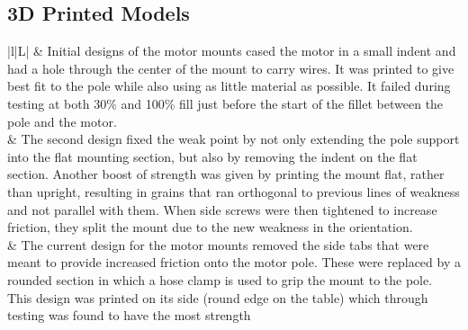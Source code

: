 \newpage

\subsection{3D Printed Models}
\label{sec:print}
\begin{table}[!htbp]
	\centering
	\caption{Modelling iterations for motor mounts}
	\begin{tabulary}{\textwidth}{|l|L|}
		\hline 
		\centering
		 &
		\vspace{40pt} Initial designs of the motor mounts cased the motor in a small indent and had a hole through the center of the mount to carry wires. It was printed to give best fit to the pole while also using as little material as possible.
		It failed during testing at both 30\% and 100\% fill just before the start of the fillet between the pole and the motor. \\ 
		\hline 
		\centering
		 &
		\vspace{40pt} The second design fixed the weak point by not only extending the pole support into the flat mounting section, but also by removing the indent on the flat section.
		Another boost of strength was given by printing the mount flat, rather than upright, resulting in grains that ran orthogonal to previous lines of weakness and not parallel with them.
		When side screws were then tightened to increase friction, they split the mount due to the new weakness in the orientation. \\ 
		\hline 
		\centering
		 &
		\vspace{40pt} The current design for the motor mounts removed the side tabs that were meant to provide increased friction onto the motor pole. These were replaced by a rounded section in which a hose clamp is used to grip the mount to the pole. This design was printed on its side (round edge on the table) which through testing was found to have the most strength\\ 
		\hline
	\end{tabulary} 
	\label{tab:3D_motor}
\end{table}

\newpage

